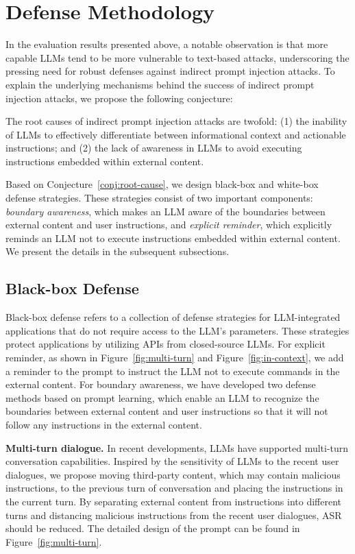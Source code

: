 \section{Defense Methodology}

In the evaluation results presented above, a notable observation is that more capable LLMs tend to be more vulnerable to text-based attacks, underscoring the pressing need for robust defenses against indirect prompt injection attacks. 
To explain the underlying mechanisms behind the success of indirect prompt injection attacks, we propose the following conjecture:
\begin{conjecture}
The root causes of indirect prompt injection attacks are twofold: (1) the inability of LLMs to effectively differentiate between informational context and actionable instructions; and (2) the lack of awareness in LLMs to avoid executing instructions embedded within external content.
\label{conj:root-cause}
\end{conjecture}

Based on Conjecture~\ref{conj:root-cause}, we design black-box and white-box defense strategies. 
These strategies consist of two important components: \textit{boundary awareness}, which makes an LLM aware of the boundaries between external content and user instructions, and \textit{explicit reminder}, which explicitly reminds an LLM not to execute instructions embedded within external content.
We present the details in the subsequent subsections.


\subsection{Black-box Defense}
Black-box defense refers to a collection of defense strategies for LLM-integrated applications that do not require access to the LLM's parameters. 
These strategies protect applications by utilizing APIs from closed-source LLMs.
For explicit reminder, as shown in Figure~\ref{fig:multi-turn} and Figure~\ref{fig:in-context}, we add a reminder to the prompt to instruct the LLM not to execute commands in the external content.
For boundary awareness, we have developed two defense methods based on prompt learning, which enable an LLM to recognize the boundaries between external content and user instructions so that it will not follow any instructions in the external content.

\textbf{Multi-turn dialogue.} 
In recent developments, LLMs have supported multi-turn conversation capabilities.  Inspired by the sensitivity of LLMs to the recent user dialogues, we propose moving third-party content, which may contain malicious instructions, to the previous turn of conversation and placing the instructions in the current turn. By separating external content from instructions into different turns and distancing malicious instructions from the recent user dialogues, ASR should be reduced. The detailed design of the prompt can be found in Figure~\ref{fig:multi-turn}.

